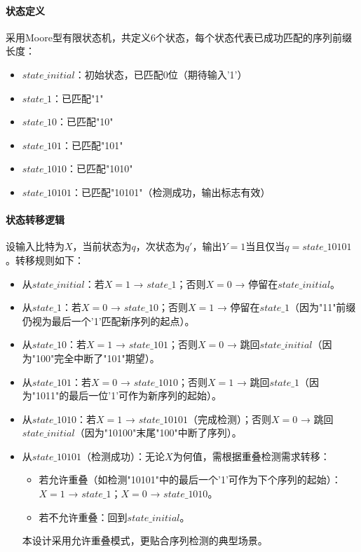 \documentclass[12pt,hyperref,a4paper,UTF8]{ctexart}
\begin{document}
\paragraph{状态定义}
采用Moore型有限状态机，共定义6个状态，每个状态代表已成功匹配的序列前缀长度：
\begin{itemize}
    \item $state\_initial$：初始状态，已匹配0位（期待输入'1'）
    \item $state\_1$：已匹配"1"
    \item $state\_10$：已匹配"10"
    \item $state\_101$：已匹配"101"
    \item $state\_1010$：已匹配"1010"
    \item $state\_10101$：已匹配"10101"（检测成功，输出标志有效）
\end{itemize}

\paragraph{状态转移逻辑}
设输入比特为$X$，当前状态为$q$，次状态为$q'$，输出$Y=1$当且仅当$q=state\_10101$。转移规则如下：
\begin{itemize}
    \item 从$state\_initial$：若$X=1$ → $state\_1$；否则$X=0$ → 停留在$state\_initial$。
    \item 从$state\_1$：若$X=0$ → $state\_10$；否则$X=1$ → 停留在$state\_1$（因为"11"前缀仍视为最后一个'1'匹配新序列的起点）。
    \item 从$state\_10$：若$X=1$ → $state\_101$；否则$X=0$ → 跳回$state\_initial$（因为"100"完全中断了"101"期望）。
    \item 从$state\_101$：若$X=0$ → $state\_1010$；否则$X=1$ → 跳回$state\_1$（因为"1011"的最后一位'1'可作为新序列的起始）。
    \item 从$state\_1010$：若$X=1$ → $state\_10101$（完成检测）；否则$X=0$ → 跳回$state\_initial$（因为"10100"末尾"100"中断了序列）。
    \item 从$state\_10101$（检测成功）：无论$X$为何值，需根据重叠检测需求转移：
        \begin{itemize}
            \item 若允许重叠（如检测"10101"中的最后一个'1'可作为下个序列的起始）：$X=1$ → $state\_1$；$X=0$ → $state\_1010$。
            \item 若不允许重叠：回到$state\_initial$。
        \end{itemize}
        本设计采用允许重叠模式，更贴合序列检测的典型场景。
\end{itemize}
\end{document}

